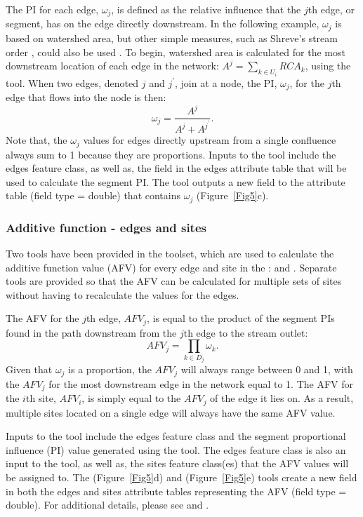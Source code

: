 \documentclass[article]{jss}
\begin{document}
The PI for each edge, $\omega_j$, is defined as the relative influence
that the $j$th edge, or segment, has on the edge directly
downstream. In the following example, $\omega_j$ is based on watershed
area, but other simple measures, such as Shreve's stream order
\citep{Shre:stat:1966}, could also be used 
\citep[e.g.,][]{Cres:Frey:Harc:Smit:spat:2006}. To begin,
watershed area is calculated for the most downstream location of each
edge in the network: $A^j=\sum_{k \in U_i}RCA_k$, using the
  tool. When two edges, denoted $j$ and $j^\prime$, join at a node, the PI, $\omega_j$, for the $j$th edge that flows into the node is then:
\[
	\omega_j = \frac{A^j}{A^j + A^{j^\prime}}.
\]
Note that, the $\omega_j$ values for edges directly upstream from a
single confluence always sum to 1 because they are proportions. Inputs
to the  tool include the  edges feature
class, as well as, the field in the edges attribute table that will be
used to calculate the segment PI. The tool outputs a new field to the 
attribute table (field type = double) that contains $\omega_j$
(Figure~\ref{Fig5}c).


\subsubsection{Additive function - edges and sites}

Two tools have been provided in the  toolset, which are used to calculate the additive function value (AFV) for every edge and site in the :  and . Separate tools are provided so that the AFV can be calculated for multiple sets of sites without having to recalculate the values for the edges.

The AFV for the $j$th edge, $AFV_j$, is equal to the product of the segment PIs found in the path downstream from the $j$th edge to the stream outlet:
\[
	AFV_j = \prod_{k \in D_j} \omega_k.
\]
Given that $\omega_j$ is a proportion, the $AFV_j$ will always range
between 0 and 1, with the $AFV_j$ for the most downstream edge in the
network equal to 1. The AFV for the $i$th site, $AFV_i$, is simply
equal to the $AFV_j$ of the edge it lies on. As a result, multiple
sites located on a single edge will always have the same AFV
value.

Inputs to the  tool include the
 edges feature class and the segment proportional influence
(PI) value generated using the  tool. The 
edges feature class is also an input to the  tool, as well as, the  sites feature class(es)
that the AFV values will be assigned to. The  (Figure~\ref{Fig5}d) and 
(Figure~\ref{Fig5}e) tools create a new field in both the edges and
sites attribute tables representing the AFV (field type = double). For
additional details, please see \citet{Pete:Ver:mixe:2010} and \citet{Pete:STAR:2011}.
\end{document}
